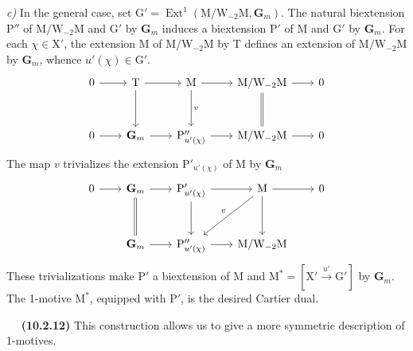 \documentclass[11pt,leqno]{article}
\newcommand{\Page}[1]{\ifvmode\noindent\else\unskip\ \fi{\footnotesize\textcolor{gray}{[p.\,#1]}}\ \ignorespaces}
\begin{document}
\textit{c)} In the general case, set
\(\mathrm{G}'=\operatorname{Ext}^{1}
(\mathrm{M}/\mathrm{W}_{-2}\mathrm{M},\mathbf{G}_m)\).
The natural biextension \(\mathrm{P}''\) of
\(\mathrm{M}/\mathrm{W}_{-2}\mathrm{M}\) and \(\mathrm{G}'\)
by \(\mathbf{G}_m\) induces a biextension \(\mathrm{P}'\)
of \(\mathrm{M}\) and \(\mathrm{G}'\) by \(\mathbf{G}_m\).
For each \(\chi\in\mathrm{X}'\), the extension \(\mathrm{M}\)
of \(\mathrm{M}/\mathrm{W}_{-2}\mathrm{M}\) by \(\mathrm{T}\)
defines an extension of
\(\mathrm{M}/\mathrm{W}_{-2}\mathrm{M}\) by \(\mathbf{G}_m\),
whence \(u'(\chi)\in\mathrm{G}'\).
\[
\begin{tikzcd}[row sep=3em, column sep=2em]
0 \arrow[r] &
\mathrm{T} \arrow[r] \arrow[d] &
\mathrm{M} \arrow[r] \arrow[d, "v"] &
\mathrm{M}/\mathrm{W}_{-2}\mathrm{M}
  \arrow[r] \arrow[d, equal] &
0\\
0 \arrow[r] &
\mathbf{G}_m \arrow[r] &
\mathrm{P}''_{u'(\chi)} \arrow[r] &
\mathrm{M}/\mathrm{W}_{-2}\mathrm{M} \arrow[r] &
0
\end{tikzcd}
\]
The map \(v\) trivializes the extension
\(\mathrm{P}'_{u'(\chi)}\) of \(\mathrm{M}\) by \(\mathbf{G}_m\)
\[
\begin{tikzcd}[row sep=3em, column sep=2em]
0 \arrow[r] &
\mathbf{G}_m \arrow[r] \arrow[d, equal] &
\mathrm{P}'_{u'(\chi)} \arrow[r] \arrow[d] &
\mathrm{M} \arrow[r] \arrow[d] \arrow[dl, "v"'] &
0\\
& \mathbf{G}_m \arrow[r] &
\mathrm{P}''_{u'(\chi)} \arrow[r] &
\mathrm{M}/\mathrm{W}_{-2}\mathrm{M} &
\end{tikzcd}
\]
These trivializations make \(\mathrm{P}'\) a biextension of
\(\mathrm{M}\) and
\(\mathrm{M}^{*}=[\mathrm{X}'\xrightarrow{u'}\mathrm{G}']\)
by \(\mathbf{G}_m\). The 1-motive \(\mathrm{M}^{*}\), equipped with
\(\mathrm{P}'\), is the desired Cartier dual.

\Page{68}
\textbf{(10.2.12)} This construction allows us to give a
more symmetric description of 1-motives.
\end{document}

